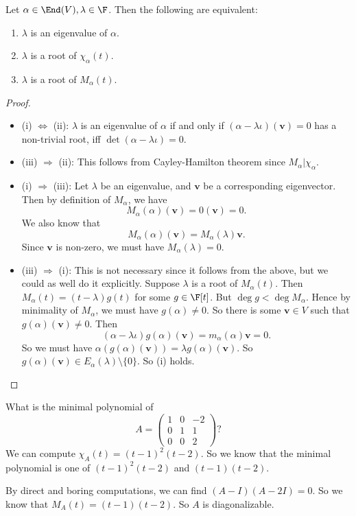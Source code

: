 \documentclass[a4paper]{article}
\begin{document}
\begin{lemma}
  Let $\alpha \in \End(V), \lambda \in \F$. Then the following are equivalent:
  \begin{enumerate}
    \item $\lambda$ is an eigenvalue of $\alpha$.
    \item $\lambda$ is a root of $\chi_\alpha(t)$.
    \item $\lambda$ is a root of $M_\alpha(t)$.
  \end{enumerate}
\end{lemma}

\begin{proof}\leavevmode
  \begin{itemize}
    \item (i) $\Leftrightarrow$ (ii): $\lambda$ is an eigenvalue of $\alpha$ if and only if $(\alpha - \lambda \iota)(\mathbf{v}) = 0$ has a non-trivial root, iff $\det(\alpha - \lambda \iota) = 0$.
    \item (iii) $\Rightarrow$ (ii): This follows from Cayley-Hamilton theorem since $M_\alpha | \chi_\alpha$.
    \item (i) $\Rightarrow$ (iii): Let $\lambda$ be an eigenvalue, and $\mathbf{v}$ be a corresponding eigenvector. Then by definition of $M_\alpha$, we have
      \[
        M_\alpha(\alpha)(\mathbf{v}) = 0(\mathbf{v}) = 0.
      \]
      We also know that
      \[
        M_\alpha(\alpha)(\mathbf{v}) = M_\alpha(\lambda)\mathbf{v}.
      \]
      Since $\mathbf{v}$ is non-zero, we must have $M_\alpha(\lambda) =0$.

    \item (iii) $\Rightarrow$ (i): This is not necessary since it follows from the above, but we could as well do it explicitly. Suppose $\lambda$ is a root of $M_\alpha(t)$. Then $M_\alpha(t) = (t - \lambda) g(t)$ for some $g \in \F[t]$. But $\deg g < \deg M_\alpha$. Hence by minimality of $M_\alpha$, we must have $g(\alpha) \not= 0$. So there is some $\mathbf{v}\in V$ such that $g(\alpha)(\mathbf{v}) \not=0$. Then
      \[
        (\alpha - \lambda\iota)g(\alpha)(\mathbf{v}) = m_\alpha(\alpha)\mathbf{v} = 0.
      \]
      So we must have $\alpha (g(\alpha)(\mathbf{v})) = \lambda g(\alpha)(\mathbf{v})$. So $g(\alpha)(\mathbf{v}) \in E_\alpha(\lambda) \setminus \{0\}$. So (i) holds.
  \end{itemize}
\end{proof}

\begin{eg}
  What is the minimal polynomial of
  \[
    A =
    \begin{pmatrix}
      1 & 0 & -2\\
      0 & 1 & 1\\
      0 & 0 & 2
    \end{pmatrix}?
  \]
  We can compute $\chi_A(t) = (t - 1)^2 (t - 2)$. So we know that the minimal polynomial is one of $(t - 1)^2(t - 2)$ and $(t - 1)(t - 2)$.

  By direct and boring computations, we can find $(A - I)(A - 2I) = 0$. So we know that $M_A(t) = (t - 1)(t - 2)$. So $A$ is diagonalizable.
\end{eg}
\end{document}
